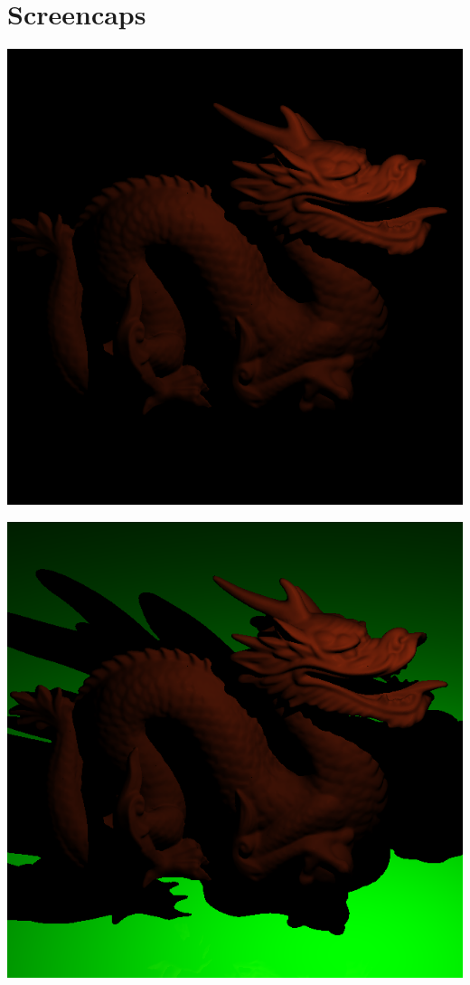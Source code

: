 \section{Screencaps}

\begin{center}
\begin{minipage}{0.48\linewidth}
\includegraphics[width=\linewidth]{img/dragon.png}
\end{minipage}
\begin{minipage}{0.48\linewidth}
\includegraphics[width=\linewidth]{img/dragon-plane.png}
\end{minipage}
\end{center}

